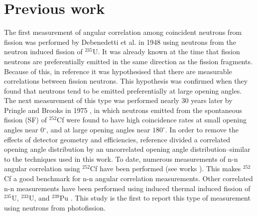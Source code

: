 \section{Previous work}
The first measurement of angular correlation among coincident neutrons from fission was performed by Debenedetti et al. \cite{1948twoNCorr} in 1948 using neutrons from the neutron induced fission of $^{235}\text{U}$. It was already known at the time that fission neutrons are preferentially emitted in the same direction as the fission fragments. Because of this, in reference \cite{1948twoNCorr} it was hypothesised that there are measurable correlations between fission neutrons. This hypothesis was confirmed when they found that neutrons tend to be emitted preferentially at large opening angles. The next measurement of this type was performed nearly 30 years later by Pringle and Brooks in 1975 \cite{1975Cf252}, in which neutrons emitted from the spontaneous fission (SF) of $^{252}$Cf were found to have high coincidence rates at small opening angles near 0$^{\circ}$, and at large opening angles near $180^{\circ}$. In order to remove the effects of detector geometry and efficiencies, reference \cite{1975Cf252} divided a correlated opening angle distribution by an uncorrelated opening angle distribution--similar to the techniques used in this work. To date, numerous measurements of n-n angular correlation using $^{252}$Cf have been performed (see works \cite{1975Cf252} \cite{2008CF252} \cite{Pozzi2014}). This makes $^{252}$Cf a good benchmark for n-n angular correlation measurements. Other correlated n-n measurements have been performed using induced thermal induced fission of $^{235}$U, $^{233}$U, and $^{239}$Pu \cite{Sokolov2010}. This study is the first to report this type of measurement using neutrons from photofission. 



